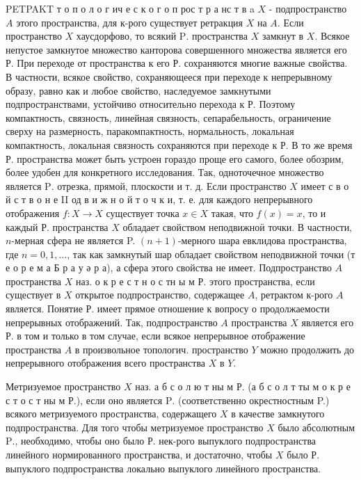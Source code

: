 \documentclass[10pt]{article}
\begin{document}
PETPAKT т о п о л о г ич е с к о г о п рос т р а нс т в a $X$ - подпространство $A$ этого пространства, для к-рого существует ретракция $X$ на $A$. Если пространство $X$ хаусдорфово, то всякий $\mathrm{P}$. пространства $X$ замкнут в $X$. Всякое непустое замкнутое множество канторова совершенного множества является его Р. При переходе от пространства к его Р. сохраняются многие важные свойства. В частности, всякое свойство, сохраняющееся при переходе к непрерывному образу, равно как и любое свойство, наследуемое замкнутыми подпространствами, устойчиво относительно перехода к Р. Поэтому компактность, связность, линейная связность, сепарабельность, ограничение сверху на размерность, паракомпактность, нормальность, локальная компактность, локальная связность сохраняются при переходе к Р. В то же время Р. пространства может быть устроен гораздо проще его самого, более обозрим, более удобен для конкретного исследования. Так, одноточечное множество является $\mathrm{P}$. отрезка, прямой, плоскости и т. д. Если пространство $X$ имеет с в о й с т в о н е II од в и ж н о й т о ч к и, т. е. для каждого непрерывного отображения $f: X \rightarrow X$ существует точка $x \in X$ такая, что $f(x)=x$, то и каждый Р. пространства $X$ обладает свойством неподвижноӥ точки. В частности, $n$-мерная сфера не является P. $(n+1)$-мерного шара евклидова пространства, где $n=0,1, \ldots$, так как замкнутый шар обладает свойством неподвижной точки (т е о р е м а Б р а у ә р а), а сфера этого свойства не имеет. Подпространство $A$ пространства $X$ наз. о к р е с т н о с тн ы м Р. этого пространства, если существует в $X$ открытое подпространство, содержащее $A$, ретрактом к-рого $A$ является. Понятие Р. имеет прямое отношение к вопросу о продолжаемости непрерывных отображений. Так, подпространство $A$ пространства $X$ является его Р. в том и только в том случае, если всякое непрерывное отображение пространства $A$ в произвольное топологич. пространство $Y$ можно продолжить до непрерывного отображения всего пространства $X$ в $Y$.



Метризуемое пространство $X$ наз. а б с о л ю т ны м Р. (а б с о л т ты м о к р е с т о с т ны м Р.), если оно является $\mathrm{P}$. (соответственно окрестностным P.) всякого метризуемого пространства, содержащего $X$ в качестве замкнутого подпространства. Для того чтобы метризуемое пространство $X$ было абсолютным $\mathrm{P}$., необходимо, чтобы оно было Р. нек-рого выпуклого подпространства линейного нормированного пространства, и достаточно, чтобы $X$ было Р. выпуклого подпространства локально выпуклого линейного пространства.
\end{document}
